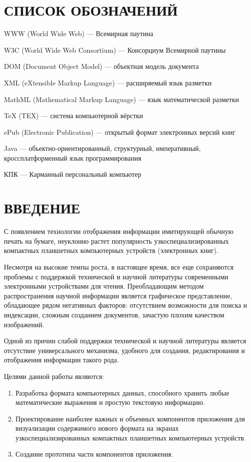 \newpage
\chapter*{СПИСОК ОБОЗНАЧЕНИЙ}
WWW (World Wide Web) — Всемирная паутина

W3C (World Wide Web Consortium) — Консорциум Всемирной паутины

DOM (Document Object Model) — объектная модель документа

XML (eXtensible Markup Language) — расширяемый язык разметки

MathML (Mathematical Markup Language) — язык математической разметки

\TeX{} (TEX) — система компьютерной вёрстки

ePub (Electronic Publication) — открытый формат электронных версий книг

Java — объектно-ориентированный, структурный, императивный, кроссплатформенный язык программирования

КПК — Карманный персональный компьютер 

\newpage
\chapter*{ВВЕДЕНИЕ}
С появлением технологии отображения информации имитирующей обычную печать на бумаге, неуклонно растет популярность узкоспециализированных компактных планшетных компьютерных устройств (электронных книг).

Несмотря на высокие темпы роста, в настоящее время, все еще сохраняются проблемы с поддержкой технической и научной литературы современными электронными устройствами для чтения. Преобладающим методом распространения научной информации является графическое представление, обладающее рядом негативных факторов: отсутствием возможности для поиска и индексации, сложным созданием документов, зачастую плохим качеством изображений.

Одной из причин слабой поддержки технической и научной литературы является отсутствие универсального механизма, удобного для создания, редактирования и отображения информации такого рода.

Целями данной работы являются:
\begin{enumerate}
 \item Разработка формата компьютерных данных, способного хранить любые математические выражения и простую текстовую информацию.
 \item Проектирование наиболее важных и объемных компонентов приложения для визуализации содержимого нового формата на экранах узкоспециализированных компактных планшетных компьютерных устройств.
 \item Создание прототипа части компонентов приложения.
\end{enumerate}


